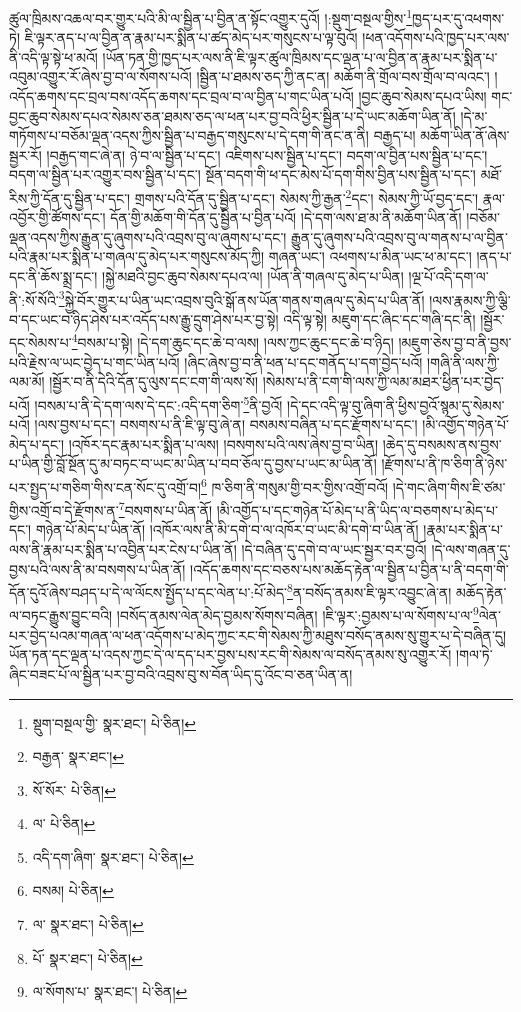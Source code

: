 ཚུལ་ཁྲིམས་འཆལ་བར་གྱུར་པའི་མི་ལ་སྦྱིན་པ་བྱིན་ན་སྟོང་འགྱུར་དུའོ། །:སྡུག་བསྔལ་གྱིས་\footnote{སྡུག་བསྔལ་གྱི་  སྣར་ཐང་།  པེ་ཅིན། }ཁྱད་པར་དུ་འཕགས་ཏེ། ཇི་ལྟར་ནད་པ་ལ་བྱིན་ན་རྣམ་པར་སྨིན་པ་ཚད་མེད་པར་གསུངས་པ་ལྟ་བུའོ། །ཕན་འདོགས་པའི་ཁྱད་པར་ལས་ནི་འདི་ལྟ་སྟེ་ཕ་མའོ། །ཡོན་ཏན་གྱི་ཁྱད་པར་ལས་ནི་ཇི་ལྟར་ཚུལ་ཁྲིམས་དང་ལྡན་པ་ལ་བྱིན་ན་རྣམ་པར་སྨིན་པ་འབུམ་འགྱུར་རོ་ཞེས་བྱ་བ་ལ་སོགས་པའོ། །སྦྱིན་པ་ཐམས་ཅད་ཀྱི་ནང་ན། མཆོག་ནི་གྲོལ་བས་གྲོལ་བ་ལའང་། །འདོད་ཆགས་དང་བྲལ་བས་འདོད་ཆགས་དང་བྲལ་བ་ལ་བྱིན་པ་གང་ཡིན་པའོ། །བྱང་ཆུབ་སེམས་དཔའ་ཡིས། གང་བྱང་ཆུབ་སེམས་དཔའ་སེམས་ཅན་ཐམས་ཅད་ལ་ཕན་པར་བྱ་བའི་ཕྱིར་སྦྱིན་པ་དེ་ཡང་མཆོག་ཡིན་ནོ། །དེ་མ་གཏོགས་པ་བཅོམ་ལྡན་འདས་ཀྱིས་སྦྱིན་པ་བརྒྱད་གསུངས་པ་དེ་དག་གི་ནང་ན་ནི། བརྒྱད་པ། མཆོག་ཡིན་ནོ་ཞེས་སྦྱར་རོ། །བརྒྱད་གང་ཞེ་ན། ཉེ་བ་ལ་སྦྱིན་པ་དང་། འཇིགས་པས་སྦྱིན་པ་དང་། བདག་ལ་བྱིན་པས་སྦྱིན་པ་དང་། བདག་ལ་སྦྱིན་པར་འགྱུར་བས་སྦྱིན་པ་དང་། སྔོན་བདག་གི་ཕ་དང་མེས་པོ་དག་གིས་བྱིན་པས་སྦྱིན་པ་དང་། མཐོ་རིས་ཀྱི་དོན་དུ་སྦྱིན་པ་དང་། གྲགས་པའི་དོན་དུ་སྦྱིན་པ་དང་། སེམས་ཀྱི་རྒྱན་\footnote{བརྒྱན་  སྣར་ཐང་། }དང་། སེམས་ཀྱི་ཡོ་བྱད་དང་། རྣལ་འབྱོར་གྱི་ཚོགས་དང་། དོན་གྱི་མཆོག་གི་དོན་དུ་སྦྱིན་པ་བྱིན་པའོ། །དེ་དག་ལས་ཐ་མ་ནི་མཆོག་ཡིན་ནོ། །བཅོམ་ལྡན་འདས་ཀྱིས་རྒྱུན་དུ་ཞུགས་པའི་འབྲས་བུ་ལ་ཞུགས་པ་དང་། རྒྱུན་དུ་ཞུགས་པའི་འབྲས་བུ་ལ་གནས་པ་ལ་བྱིན་པའི་རྣམ་པར་སྨིན་པ་གཞལ་དུ་མེད་པར་གསུངས་མོད་ཀྱི། གཞན་ཡང་། འཕགས་པ་མིན་ཡང་ཕ་མ་དང་། །ནད་པ་དང་ནི་ཆོས་སྨྲ་དང་། །སྐྱེ་མཐའི་བྱང་ཆུབ་སེམས་དཔའ་ལ། །ཡོན་ནི་གཞལ་དུ་མེད་པ་ཡིན། །ལྔ་པོ་འདི་དག་ལ་ནི་:སོ་སོའི་\footnote{སོ་སོར་  པེ་ཅིན། }སྐྱེ་བོར་གྱུར་པ་ཡིན་ཡང་འབྲས་བུའི་སྒོ་ནས་ཡོན་གནས་གཞལ་དུ་མེད་པ་ཡིན་ནོ། །ལས་རྣམས་ཀྱི་ལྕི་བ་དང་ཡང་བ་ཉིད་ཤེས་པར་འདོད་པས་རྒྱུ་དྲུག་ཤེས་པར་བྱ་སྟེ། འདི་ལྟ་སྟེ། མཇུག་དང་ཞིང་དང་གཞི་དང་ནི། །སྦྱོར་དང་སེམས་པ་\footnote{ལ་  པེ་ཅིན། }བསམ་པ་སྟེ། །དེ་དག་ཆུང་དང་ཆེ་བ་ལས། །ལས་ཀྱང་ཆུང་དང་ཆེ་བ་ཉིད། །མཇུག་ཅེས་བྱ་བ་ནི་བྱས་པའི་རྗེས་ལ་ཡང་བྱེད་པ་གང་ཡིན་པའོ། །ཞིང་ཞེས་བྱ་བ་ནི་ཕན་པ་དང་གནོད་པ་དག་བྱེད་པའོ། །གཞི་ནི་ལས་ཀྱི་ལམ་མོ། །སྦྱོར་བ་ནི་དེའི་དོན་དུ་ལུས་དང་ངག་གི་ལས་སོ། །སེམས་པ་ནི་ངག་གི་ལས་ཀྱི་ལམ་མཐར་ཕྱིན་པར་བྱེད་པའོ། །བསམ་པ་ནི་དེ་དག་ལས་དེ་དང་:འདི་དག་ཅིག་\footnote{འདི་དག་ཞིག་  སྣར་ཐང་།  པེ་ཅིན། }ནི་བྱའོ། །དེ་དང་འདི་ལྟ་བུ་ཞིག་ནི་ཕྱིས་བྱའོ་སྙམ་དུ་སེམས་པའོ། །ལས་བྱས་པ་དང་། བསགས་པ་ནི་ཇི་ལྟ་བུ་ཞེ་ན། བསམས་བཞིན་པ་དང་རྫོགས་པ་དང་། །མི་འགྱོད་གཉེན་པོ་མེད་པ་དང་། །འཁོར་དང་རྣམ་པར་སྨིན་པ་ལས། །བསགས་པའི་ལས་ཞེས་བྱ་བ་ཡིན། །ཆེད་དུ་བསམས་ནས་བྱས་པ་ཡིན་གྱི་བློ་སྔོན་དུ་མ་བཏང་བ་ཡང་མ་ཡིན་པ་བབ་ཅོལ་དུ་བྱས་པ་ཡང་མ་ཡིན་ནོ། །རྫོགས་པ་ནི་ཁ་ཅིག་ནི་ཉེས་པར་སྤྱད་པ་གཅིག་གིས་ངན་སོང་དུ་འགྲོ་བ།\footnote{བསམ།  པེ་ཅིན། } ཁ་ཅིག་ནི་གསུམ་གྱི་བར་གྱིས་འགྲོ་བའོ། །དེ་གང་ཞིག་གིས་ཇི་ཙམ་གྱིས་འགྲོ་བ་དེ་རྫོགས་ན་\footnote{ལ་  སྣར་ཐང་།  པེ་ཅིན། }བསགས་པ་ཡིན་ནོ། །མི་འགྱོད་པ་དང་གཉེན་པོ་མེད་པ་ནི་ཡིད་ལ་བཅགས་པ་མེད་པ་དང་། གཉེན་པོ་མེད་པ་ཡིན་ནོ། །འཁོར་ལས་ནི་མི་དགེ་བ་ལ་འཁོར་བ་ཡང་མི་དགེ་བ་ཡིན་ནོ། །རྣམ་པར་སྨིན་པ་ལས་ནི་རྣམ་པར་སྨིན་པ་འབྱིན་པར་ངེས་པ་ཡིན་ནོ། །དེ་བཞིན་དུ་དགེ་བ་ལ་ཡང་སྦྱར་བར་བྱའོ། །དེ་ལས་གཞན་དུ་བྱས་པའི་ལས་ནི་མ་བསགས་པ་ཡིན་ནོ། །འདོད་ཆགས་དང་བཅས་པས་མཆོད་རྟེན་ལ་སྦྱིན་པ་བྱིན་པ་ནི་བདག་གི་དོན་དུའོ་ཞེས་བཤད་པ་དེ་ལ་ལོངས་སྤྱོད་པ་དང་ལེན་པ་:པོ་མེད་\footnote{པོ་  སྣར་ཐང་།  པེ་ཅིན། }ན་བསོད་ནམས་ཇི་ལྟར་འབྱུང་ཞེ་ན། མཆོད་རྟེན་ལ་བཏང་རྒྱུས་བྱུང་བའི། །བསོད་ནམས་ལེན་མེད་བྱམས་སོགས་བཞིན། །ཇི་ལྟར་:བྱམས་པ་ལ་སོགས་པ་ལ་\footnote{ལ་སོགས་པ་  སྣར་ཐང་།  པེ་ཅིན། }ལེན་པར་བྱེད་པའམ་གཞན་ལ་ཕན་འདོགས་པ་མེད་ཀྱང་རང་གི་སེམས་ཀྱི་མཐུས་བསོད་ནམས་སུ་གྱུར་པ་དེ་བཞིན་དུ། ཡོན་ཏན་དང་ལྡན་པ་འདས་ཀྱང་དེ་ལ་དད་པར་བྱས་པས་རང་གི་སེམས་ལ་བསོད་ནམས་སུ་འགྱུར་རོ། །གལ་ཏེ་ཞིང་བཟང་པོ་ལ་སྦྱིན་པར་བྱ་བའི་འབྲས་བུ་ས་བོན་ཡིད་དུ་འོང་བ་ཅན་ཡིན་ན། 